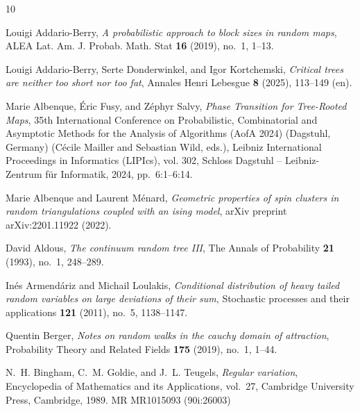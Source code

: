 \documentclass[a4paper,11pt]{article}
\begin{document}
\providecommand{\bysame}{\leavevmode\hbox to3em{\hrulefill}\thinspace}
\providecommand{\MR}{\relax\ifhmode\unskip\space\fi MR }
\providecommand{\MRhref}[2]{%
  \href{http://www.ams.org/mathscinet-getitem?mr=#1}{#2}
}
\providecommand{\href}[2]{#2}
\begin{thebibliography}{10}

Louigi Addario-Berry, \emph{A probabilistic approach to block sizes in random
  maps}, ALEA Lat. Am. J. Probab. Math. Stat \textbf{16} (2019), no.~1, 1--13.

Louigi Addario-Berry, Serte Donderwinkel, and Igor Kortchemski, \emph{Critical
  trees are neither too short nor too fat}, Annales Henri Lebesgue \textbf{8}
  (2025), 113--149 (en).

Marie Albenque, \'{E}ric Fusy, and Z\'{e}phyr Salvy, \emph{{Phase Transition
  for Tree-Rooted Maps}}, 35th International Conference on Probabilistic,
  Combinatorial and Asymptotic Methods for the Analysis of Algorithms (AofA
  2024) (Dagstuhl, Germany) (C\'{e}cile Mailler and Sebastian Wild, eds.),
  Leibniz International Proceedings in Informatics (LIPIcs), vol. 302, Schloss
  Dagstuhl -- Leibniz-Zentrum f{\"u}r Informatik, 2024, pp.~6:1--6:14.

Marie Albenque and Laurent M{\'e}nard, \emph{Geometric properties of spin
  clusters in random triangulations coupled with an ising model}, arXiv
  preprint arXiv:2201.11922 (2022).

David Aldous, \emph{The continuum random tree {III}}, The Annals of Probability
  \textbf{21} (1993), no.~1, 248--289.

In{\'e}s Armend{\'a}riz and Michail Loulakis, \emph{Conditional distribution of
  heavy tailed random variables on large deviations of their sum}, Stochastic
  processes and their applications \textbf{121} (2011), no.~5, 1138--1147.

Quentin Berger, \emph{Notes on random walks in the cauchy domain of
  attraction}, Probability Theory and Related Fields \textbf{175} (2019),
  no.~1, 1--44.

N.~H. Bingham, C.~M. Goldie, and J.~L. Teugels, \emph{Regular variation},
  Encyclopedia of Mathematics and its Applications, vol.~27, Cambridge
  University Press, Cambridge, 1989. \MR{MR1015093 (90i:26003)}


\end{thebibliography}
\end{document}
